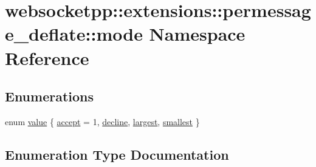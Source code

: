 \hypertarget{namespacewebsocketpp_1_1extensions_1_1permessage__deflate_1_1mode}{}\section{websocketpp\+:\+:extensions\+:\+:permessage\+\_\+deflate\+:\+:mode Namespace Reference}
\label{namespacewebsocketpp_1_1extensions_1_1permessage__deflate_1_1mode}
\subsection*{Enumerations}
\begin{DoxyCompactItemize}
\item 
enum \hyperlink{namespacewebsocketpp_1_1extensions_1_1permessage__deflate_1_1mode_ae06aef93260cb0b5f5bd729a82564120}{value} \{ \hyperlink{namespacewebsocketpp_1_1extensions_1_1permessage__deflate_1_1mode_ae06aef93260cb0b5f5bd729a82564120ac001b9dafe12f8f4f812588d9c41e9da}{accept} = 1, 
\hyperlink{namespacewebsocketpp_1_1extensions_1_1permessage__deflate_1_1mode_ae06aef93260cb0b5f5bd729a82564120af37f3279b22c67273d84c30811f4d3a4}{decline}, 
\hyperlink{namespacewebsocketpp_1_1extensions_1_1permessage__deflate_1_1mode_ae06aef93260cb0b5f5bd729a82564120af2f3ee153c2edcb52b23191ff6ff4374}{largest}, 
\hyperlink{namespacewebsocketpp_1_1extensions_1_1permessage__deflate_1_1mode_ae06aef93260cb0b5f5bd729a82564120ae726aa33271e359a9256338cc23881af}{smallest}
 \}
\end{DoxyCompactItemize}


\subsection{Enumeration Type Documentation}
\hypertarget{namespacewebsocketpp_1_1extensions_1_1permessage__deflate_1_1mode_ae06aef93260cb0b5f5bd729a82564120}{}
